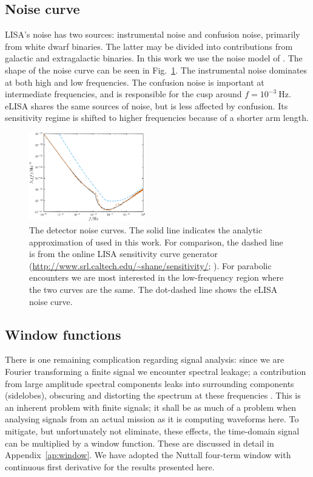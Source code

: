 \documentclass[useAMS,usedcolumn,usegraphicx,usenatbib]{mn2e}
\newcommand{\figref}[1]{Fig.~\ref{fig:#1}}
\newcommand{\apref}[1]{Appendix~\ref{ap:#1}}
\newcommand{\units}[1]{\ensuremath{~\mathrm{#1}}}
\begin{document}
\subsection{Noise curve}\label{sec:Noise}

LISA's noise has two sources: instrumental noise and confusion noise, primarily from white dwarf binaries. The latter may be divided into contributions from galactic and extragalactic binaries. In this work we use the noise model of \citet{Barack2004}. The shape of the noise curve can be seen in \figref{Noise}. The instrumental noise dominates at both high and low frequencies. The confusion noise is important at intermediate frequencies, and is responsible for the cusp around $f = 10^{-3}\units{Hz}$. eLISA shares the same sources of noise, but is less affected by confusion. Its sensitivity regime is shifted to higher frequencies because of a shorter arm length.
\begin{figure}
\begin{center}
\includegraphics[width=0.45\textwidth]{Fig_Noise}
\caption{The detector noise curves. The solid line indicates the analytic approximation of \citet{Barack2004} used in this work. For comparison, the dashed line is from the online LISA sensitivity curve generator (\url{http://www.srl.caltech.edu/~shane/sensitivity/}; \citealt*{Larson2000, Larson2002}). For parabolic encounters we are most interested in the low-frequency region where the two curves are the same. The dot-dashed line shows the eLISA noise curve.}
\label{fig:Noise}
\end{center}
\end{figure}

\subsection{Window functions}

There is one remaining complication regarding signal analysis: since we are Fourier transforming a finite signal we encounter spectral leakage; a contribution from large amplitude spectral components leaks into surrounding components (sidelobes), obscuring and distorting the spectrum at these frequencies \citep{Harris1978}. This is an inherent problem with finite signals; it shall be as much of a problem when analysing signals from an actual mission as it is computing waveforms here. To mitigate, but unfortunately not eliminate, these effects, the time-domain signal can be multiplied by a window function. These are discussed in detail in \apref{window}. We have adopted the Nuttall four-term window with continuous first derivative \citep{Nuttall1981} for the results presented here.
\end{document}
